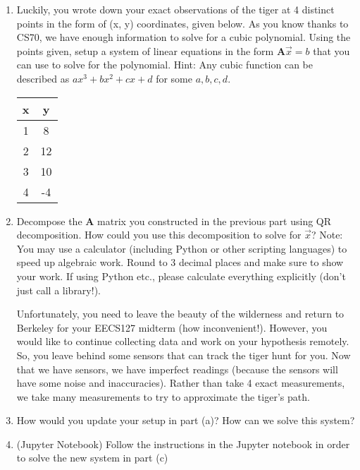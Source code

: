 \begin{enumerate}
\item Luckily, you wrote down your exact observations of the tiger at 4 distinct points in the form of (x, y) coordinates, given below. As you know thanks to CS70, we have enough information to solve for a cubic polynomial. Using the points given, setup a system of linear equations in the form $\mathbf{A}\vec{x} = b$ that you can use to solve for the polynomial.
Hint: Any cubic function can be described as $ax^3 + bx^2 + cx + d$ for some $a, b, c, d$.

\begin{center}
 \begin{tabular}{c | c} 
 x & y \\ [0.5ex] 
 \hline
 1 & 8 \\ 
 2 & 12 \\
 3 & 10  \\
 4 & -4  \\
\end{tabular}
\end{center}

\newline
\sol{}
\newline

\item Decompose the $\mathbf{A}$ matrix you constructed in the previous part using QR decomposition. How could you use this decomposition to solve for $\vec{x}$? Note: You may use a calculator (including Python or other scripting languages) to speed up algebraic work. Round to 3 decimal places and make sure to show your work. If using Python etc., please calculate everything explicitly (don't just call a library!).

\newline
\sol{}
\newline

Unfortunately, you need to leave the beauty of the wilderness and return to Berkeley for your EECS127 midterm (how inconvenient!). However, you would like to continue collecting data and work on your hypothesis remotely. So, you leave behind some sensors that can track the tiger hunt for you. Now that we have sensors, we have imperfect readings (because the sensors will have some noise and inaccuracies). Rather than take 4 exact measurements, we take many measurements to try to approximate the tiger's path.

\newline
\item How would you update your setup in part (a)? How can we solve this system?

\newline
\sol{}
\newline

\item (Jupyter Notebook) Follow the instructions in the Jupyter notebook in order to solve the new system in part (c)

\newline
\sol{}
\newline

\end{enumerate}